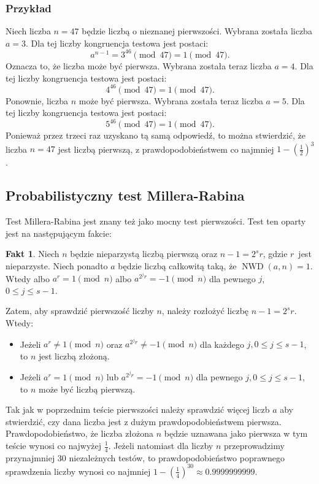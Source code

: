 \documentclass[12pt,twoside,a4]{mwbk}
\theoremstyle{definition}
\newtheorem{fakt}{Fakt}[chapter]
\DeclareMathOperator{\NWD}{NWD}
\begin{document}
\subsubsection{Przykład}
Niech liczba $n = 47$ będzie liczbą o nieznanej pierwszości. Wybrana została liczba $a = 3$. Dla tej liczby kongruencja testowa jest postaci:
\[ a^{n-1} = 3^{46} \pmod {47} = 1 \pmod{47}. \]
Oznacza to, że liczba może być pierwsza. Wybrana została teraz liczba $a = 4$. Dla tej liczby kongruencja testowa jest postaci:
\[ 4^{46} \pmod{47} = 1 \pmod{47}. \]
Ponownie, liczba $n$ może być pierwsza. Wybrana została teraz liczba $a = 5$. Dla tej liczby kongruencja testowa jest postaci:
\[ 5^{46} \pmod{47} = 1 \pmod{47}. \]
Ponieważ przez trzeci raz uzyskano tą samą odpowiedź, to można stwierdzić, że liczba $n = 47$ jest liczbą pierwszą, z prawdopodobieństwem co najmniej $1 - \left( \frac{1}{2} \right)^3$.

\subsection{Probabilistyczny test Millera-Rabina}
Test Millera-Rabina jest znany też jako mocny test pierwszości. Test ten oparty jest na następującym fakcie:
\begin{fakt}{{\cite{markowe}}}
Niech $n$ będzie nieparzystą liczbą pierwszą oraz $n-1 = 2^sr$, gdzie $r$~jest nieparzyste. Niech ponadto $a$ będzie liczbą całkowitą taką, że $\NWD(a,n)=1$. Wtedy albo $a^r = 1 \pmod{n}$ albo $a^{2^jr} = -1 \pmod{n}$ dla pewnego $j$, $0 \leq j \leq s-1$.
\end{fakt}
Zatem, aby sprawdzić pierwszość liczby $n$, należy rozłożyć liczbę $n-1 = 2^sr$. Wtedy:
\begin{itemize}
\item Jeżeli $a^r \neq 1 \pmod{n}$ oraz $a^{2^jr} \neq -1 \pmod{n}$ dla każdego $j, 0\leq j \leq s-1$, to $n$ jest liczbą złożoną.
\item Jeżeli $a^r = 1 \pmod{n}$ lub $a^{2^jr} = - 1 \pmod{n}$ dla pewnego $j, 0\leq j \leq s-1$, to $n$ może być liczbą pierwszą.
\end{itemize}
Tak jak w poprzednim teście pierwszości należy sprawdzić więcej liczb $a$ aby stwierdzić, czy dana liczba jest z dużym prawdopodobieństwem pierwsza. Prawdopodobieństwo, że liczba złożona $n$ będzie uznawana jako pierwsza w tym teście wynosi co najwyżej $\frac{1}{4}$. Jeżeli natomiast dla liczby $n$ przeprowadzimy przynajmniej 30 niezależnych testów, to prawdopodobieństwo poprawnego sprawdzenia liczby wynosi co najmniej $1 - \left( \frac{1}{4}\right)^{30} \approx 0.9999999999$.
\end{document}
